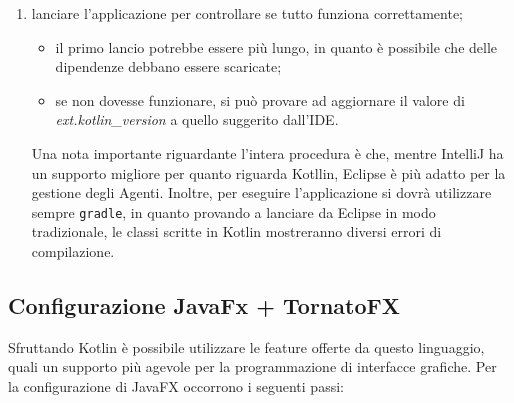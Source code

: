 \documentclass[12pt,a4paper,openright,oneside]{report}
\begin{document}
\begin{enumerate}
	\item lanciare l'applicazione per controllare se tutto funziona correttamente;
	\begin{itemize}
		\item il primo lancio potrebbe essere più lungo, in quanto è possibile che delle dipendenze debbano essere scaricate;
		\item se non dovesse funzionare, si può provare ad aggiornare il valore di \textit{ext.kotlin\_version} a quello suggerito dall'IDE.
	\end{itemize}

Una nota importante riguardante l'intera procedura è che, mentre IntelliJ ha un supporto migliore per quanto riguarda Kotllin, Eclipse è più adatto per la gestione degli Agenti. Inoltre, per eseguire l'applicazione si dovrà utilizzare sempre \texttt{gradle}, in quanto provando a lanciare da Eclipse in modo tradizionale, le classi scritte in Kotlin mostreranno diversi errori di compilazione.
\end{enumerate}



\subsection{Configurazione JavaFx + TornatoFX}
Sfruttando Kotlin è possibile utilizzare le feature offerte da questo linguaggio, quali un supporto più agevole per la programmazione di interfacce grafiche. Per la configurazione di JavaFX occorrono i seguenti passi:
\end{document}
